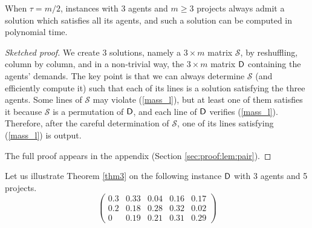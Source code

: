 \documentclass{article}
\begin{document}
\begin{comment}
We create three solutions by reshuffling the declarations of the agents, i.e., a bijection between the coordinates of the agents' declarations and the coordinates of the three solutions is found. The bijection is such that every new solution satisfies the three agents, but it is not guaranteed that every solution is feasible since (\ref{mass_l}) can be violated. However, at least one of the three solutions must satisfy (\ref{mass_l}) because they are permutations of the agents' declarations, and each agent's declaration satisfies (\ref{mass_l}). Therefore, after a careful determination of the bijection which constitutes the main technical part of the result, one of the three constructed solutions satisfying (\ref{mass_l}) is output.
\end{comment}

\begin{theorem} \label{thm3} When $\tau=m/2$, instances with 3 agents and $m \ge 3$ projects always admit a solution which satisfies all its agents, and such a solution can be computed in polynomial time.    
\end{theorem}


\begin{proof} [Sketched proof] 
We create 3 solutions, namely a $3 \times m$ matrix $\mathcal{S}$, by reshuffling, column by column, and in a non-trivial way, the $3 \times m$ matrix ${\sf D}$ containing the agents' demands. The key point is that we can always determine $\mathcal{S}$ (and efficiently compute it) such that each of its lines is a solution satisfying the three 
agents. 
Some lines of $\mathcal{S}$ may violate (\ref{mass_l}), but at least one of them  satisfies it because $\mathcal{S}$ is a permutation of ${\sf D}$, and each line of ${\sf D}$ verifies (\ref{mass_l}). Therefore, after the careful determination of $\mathcal{S}$, one of its lines satisfying (\ref{mass_l}) is output. 

The full proof appears in the appendix (Section \ref{sec:proof:lem:pair}). 
\end{proof}

Let us illustrate Theorem \ref{thm3} on the following instance ${\sf D}$ with 3 agents and 5 projects. 
\begin{equation} \label{mat1}
\left( \begin{array}{ccccc}
0.3 & 0.33 & 0.04 & 0.16& 0.17\\
0.2 & 0.18 & 0.28& 0.32& 0.02 \\
0 & 0.19 & 0.21& 0.31& 0.29   
\end{array} \right) \end{equation}
\end{document}
